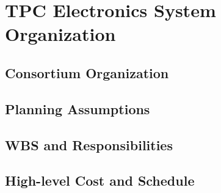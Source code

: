\section{TPC Electronics System Organization}
\label{sec:fdsp-tpc-elec-org}

\subsection{Consortium Organization}
\label{sec:fdsp-tpc-elec-org-consortium}


\subsection{Planning Assumptions}
\label{sec:fdsp-tpc-elec-org-assmp}


\subsection{WBS and Responsibilities}
\label{sec:fdsp-tpc-elec-org-wbs}

\subsection{High-level Cost and Schedule}
\label{sec:fdsp-tpc-elec-org-cs}














